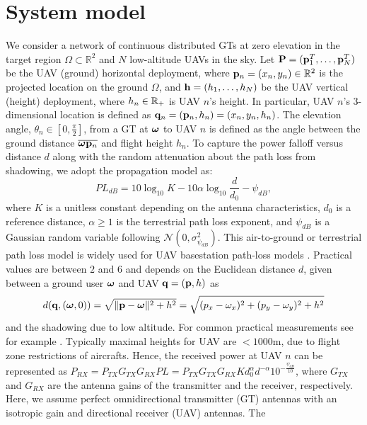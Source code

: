 \documentclass[smallabstract,smallcaptions]{dccpaper}
\newcounter{example}[section]
\newcommand{\bH}{\ensuremath{\vh}}          %
\begin{document}
\section{System model}\label{sec:model}
%
We consider a network of continuous distributed GTs at zero elevation in the target region $\Omega\subset\mathbb{R}^2$ and $N$
low-altitude UAVs in the sky.  Let $\mathbf P =({\mathbf p}_1^T,\dots,{\mathbf p}_N^T)$ be the UAV (ground) horizontal deployment, where
${\mathbf p}_n=(x_n, y_n)\in\mathbb{R}^2$ is the projected location on the ground $\Omega$, and $\bH=(h_1,\dots,h_N)$ be the
UAV vertical (height) deployment, where $h_n\in{\ensuremath{\mathbb R}}_+$ is UAV $n$'s height.  In particular, UAV $n$'s 3-dimensional
location is defined as ${\mathbf q}_n=({\mathbf p}_n,h_n)=(x_n,y_n, h_n)$.  The elevation angle, $\theta_n\in[0,\frac{\pi}{2}]$, from
a GT at $\boldsymbol{ \omega}$ to UAV $n$ is defined as the angle between the ground distance $\overline{\boldsymbol{ \omega} {\mathbf p}_n}$ and flight
height $h_n$. 
To capture the power falloff versus distance $d$ along with the random attenuation about the path loss from shadowing, we adopt the propagation
model \cite[(2.51)]{AG} as:
%
\begin{equation}
  PL_{dB}=10\log_{10}{K}-10\alpha\log_{10}{\frac{d}{d_0}}-\psi_{dB},
\end{equation}
%
where $K$ is a unitless constant depending on the antenna characteristics, $d_0$ is a reference distance, $\alpha\geq 1$
is the terrestrial path loss exponent, and $\psi_{dB}$ is a Gaussian random variable following
$\mathcal{N}\left(0,\sigma^2_{\psi_{dB}}\right)$. This air-to-ground or terrestrial path loss model is widely used for
UAV basestation path-loss models \cite{MSBD16a}. Practical values are between $2$ and $6$ and depends on the Euclidean distance $d$, given between a ground user $\boldsymbol{ \omega}$ and UAV ${\mathbf q}=({\mathbf p},h)$ as
%
\begin{align}
  d({\mathbf q},(\boldsymbol{ \omega},0))=\sqrt{\|{\mathbf p}-\boldsymbol{ \omega}\|^2+h^2}=\sqrt{(p_{x}-\omega_x)^2+(p_{y}-\omega_y)^2+h^2}\label{eq:eucd}
\end{align}
%
and the shadowing due to low altitude.  For common practical measurements see for example \cite{AG18}.  Typically
maximal heights for UAV are $<1000$m, due to flight zone restrictions of aircrafts.  Hence, the received power at
UAV $n$ can be represented as
%
  $P_{RX}=P_{TX}G_{TX}G_{RX}PL=P_{TX}G_{TX}G_{RX}Kd^{\alpha}_0 d^{-\alpha}10^{-\frac{\psi_{dB}}{10}}$,
%
where $G_{TX}$ and $G_{RX}$ are the antenna gains of the transmitter and the receiver, respectively. Here, we assume
perfect omnidirectional transmitter (GT) antennas with an isotropic gain and directional receiver (UAV) antennas.  The
\end{document}
